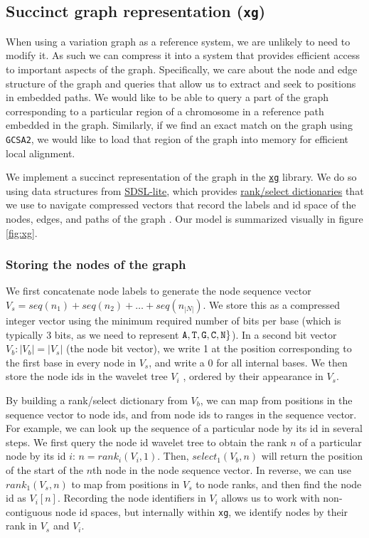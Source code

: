\documentclass[12pt]{article}
\newcommand{\gcsa}{{\tt GCSA2}}
\begin{document}
\subsection{Succinct graph representation ({\tt xg})}

When using a variation graph as a reference system, we are unlikely to need to modify it.
As such we can compress it into a system that provides efficient access to important aspects of the graph.
Specifically, we care about the node and edge structure of the graph and queries that allow us to extract and seek to positions in embedded paths.
We would like to be able to query a part of the graph corresponding to a particular region of a chromosome in a reference path embedded in the graph.
Similarly, if we find an exact match on the graph using \gcsa, we would like to load that region of the graph into memory for efficient local alignment.

We implement a succinct representation of the graph in the \href{https://github.com/vgteam/xg}{{\tt xg}} library.
We do so using data structures from \href{https://github.com/simongog/sdsl-lite}{SDSL-lite}, which provides \href{https://en.wikipedia.org/wiki/Succinct_data_structure#Succinct_dictionaries}{rank/select dictionaries} that we use to navigate compressed vectors that record the labels and id space of the nodes, edges, and paths of the graph \cite{okanohara2007}.
Our model is summarized visually in figure \ref{fig:xg}.

\subsubsection{Storing the nodes of the graph}

We first concatenate node labels to generate the node sequence vector $V_s = seq(n_1) + seq(n_2) + \ldots + seq(n_{|N|})$.
We store this as a compressed integer vector using the minimum required number of bits per base (which is typically 3 bits, as we need to represent ${\tt A, T, G, C, N} \}$).
In a second bit vector $V_b : |V_b| = |V_s|$ (the node bit vector), we write 1 at the position corresponding to the first base in every node in $V_s$, and write a 0 for all internal bases.
We then store the node ids in the wavelet tree $V_i$ \cite{grossi2003high}, ordered by their appearance in $V_s$.

By building a rank/select dictionary from $V_b$, we can map from positions in the sequence vector to node ids, and from node ids to ranges in the sequence vector.
For example, we can look up the sequence of a particular node by its id in several steps.
We first query the node id wavelet tree to obtain the rank $n$ of a particular node by its id $i$: $n = rank_{i}(V_i, 1)$.
Then, $select_1(V_b, n)$ will return the position of the start of the $n$th node in the node sequence vector.
In reverse, we can use $rank_1(V_s, n)$ to map from positions in $V_s$ to node ranks, and then find the node id as $V_i[n]$.
Recording the node identifiers in $V_i$ allows us to work with non-contiguous node id spaces, but internally within {\tt xg}, we identify nodes by their rank in $V_s$ and $V_i$.
\end{document}
